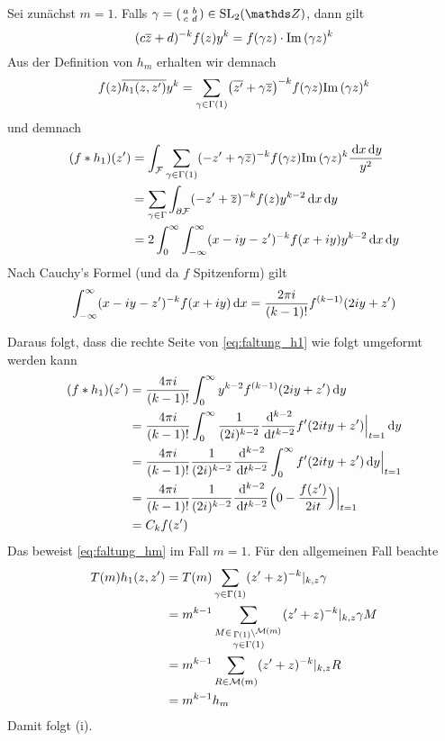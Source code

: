 \begin{bewe}
	Sei zunächst $m=1$.
	Falls $\gamma = \abcd \in \SL_2(\ZZ)$, dann gilt
	\[
	(c\overline{z} + d)^{-k} f(z) y^k = f(\gamma z) \cdot \mathrm{Im}\, (\gamma z)^k
	\]
	Aus der Definition von $h_m$ erhalten wir demnach
	\[
	f(z)\overline{h_1(z, z')} y^k
	= \sum_{\gamma \in \Gamma(1)} \bigl(\overline{z'} + \gamma \overline{z}\bigr)^{-k} f(\gamma z) \mathrm{Im}\,(\gamma z)^k
	\]
	und demnach
	\begin{equation}\label{eq:faltung_h1}%
	\begin{split}
	(f * h_1)(z') &= \int_\F \sum_{\gamma \in \Gamma(1)} (-z' + \gamma \conj z)^{-k} f(\gamma z) \Im(\gamma z)^k \frac{\opd x \opd y}{y^2} \\
	&= \sum_{\gamma \in \Gamma} \int_{\partial \F} (-z' + \conj z)^{-k} f(z) y^{k-2} \opd x \opd y \\
	&= 2 \int_0^\infty \int_{-\infty}^\infty (x-iy - z')^{-k} f(x+iy) y^{k-2} \opd x \opd y
	\end{split}
	\end{equation}
	Nach Cauchy's Formel (und da $f$ Spitzenform) gilt
	\[
	\int_{-\infty}^\infty (x-iy - z')^{-k} f(x+iy) \,\mathrm{d} x
	= \frac{2\pi i}{(k-1)!} f^{(k-1)} (2iy + z')
	\]
	
	Daraus folgt, dass die rechte Seite von \eqref{eq:faltung_h1} wie folgt umgeformt werden kann
	\begin{equation*}
	\begin{split}
	(f * h_1)(z') &= \frac{4\pi i}{(k-1)!} \int_0^\infty y^{k-2} f^{(k-1)} (2iy + z') \,\mathrm{d} y \\
	&= \frac{4\pi i}{(k-1)!} \int_0^\infty \frac{1}{(2i)^{k-2}} \frac{\,\mathrm{d}^{k-2}}{\,\mathrm{d} t^{k-2}} f'(2ity + z') \Big|_{t=1} \,\mathrm{d} y \\
	&= \frac{4\pi i}{(k-1)!} \frac{1}{(2i)^{k-2}} \frac{\,\mathrm{d}^{k-2}}{\,\mathrm{d} t^{k-2}} \int_0^\infty f'(2i ty + z') \,\mathrm{d} y \Big|_{t=1} \\
	&= \frac{4\pi i}{(k-1)!} \frac{1}{(2i)^{k-2}} \frac{\,\mathrm{d}^{k-2}}{\,\mathrm{d} t^{k-2}} \Bigl( 0 - \frac{f(z')}{2it}\Bigr) \Big|_{t=1} \\
	&= C_k f(z')
	\end{split}
	\end{equation*}
	Das beweist \eqref{eq:faltung_hm} im Fall $m=1$.
	Für den allgemeinen Fall beachte
	\[
	\begin{split}
	T(m)h_1(z,z')
	&= T(m) \sum_{\gamma\in\Gamma(1)} (z'+z)^{-k} |_{k,z} \gamma \\
	&= m^{k-1} \sum_{\substack{M \in \linksmodulo{\Gamma(1)}{\M(m)}\\ \gamma \in \Gamma(1)}} (z'+z)^{-k} |_{k,z} \gamma M \\
	&= m^{k-1} \sum_{R \in \M(m)} (z'+z)^{-k}|_{k,z} R \\
	&= m^{k-1} h_m
	\end{split}
	\]
	Damit folgt (i).
	

\end{bewe}

